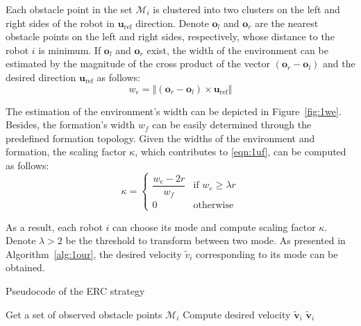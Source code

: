 Each obstacle point in the set $\mathcal{M}_{i}$ is clustered into two clusters on the left and right sides of the robot in $\mathbf{u}_\text{ref}$ direction. Denote $\mathbf{o}_l$ and $\mathbf{o}_r$ are the nearest obstacle points on the left and right sides, respectively, whose distance to the robot $i$ is minimum. If $\mathbf{o}_l$ and $\mathbf{o}_r$ exist, the width of the environment can be estimated by the magnitude of the cross product of the vector $(\mathbf{o}_r-\mathbf{o}_l)$ and the desired direction $\mathbf{u}_\text{ref}$ as follows:
\begin{equation}
    w_e= \left\Vert\left(\mathbf{o}_r-\mathbf{o}_l\right)\times \mathbf{u}_\text{ref}\right\Vert
    \label{eqn:1we}
\end{equation}

The estimation of the environment's width can be depicted in Figure~\ref{fig:1we}. Besides, the formation's width $w_f$ can be easily determined through the predefined formation topology. Given the widths of the environment and formation, the scaling factor $\kappa$, which contributes to \eqref{eqn:1uf}, can be computed as follows:
\begin{equation}
    \kappa = 
    \begin{cases} 
        \dfrac{w_e - 2r}{w_f} & \text{if } w_e \geq \lambda r \\
        0 & \text{otherwise}
    \end{cases}
    \label{eqn:1kappa}
\end{equation}

As a result, each robot $i$ can choose its mode and compute scaling factor $\kappa$. Denote $\lambda>2$ be the threshold to transform between two mode. As presented in Algorithm~\ref{alg:1our}, the desired velocity $\tilde{v}_i$ corresponding to its mode can be obtained.
\begin{algorithm}[h!]
\caption{Pseudocode of the ERC strategy}
\label{alg:1our}
Get a set of observed obstacle points $\mathcal{M}_i$\;
Compute desired velocity $\tilde{\mathbf{v}}_i$
\Return $\tilde{\mathbf{v}}_i$\;
\end{algorithm}

